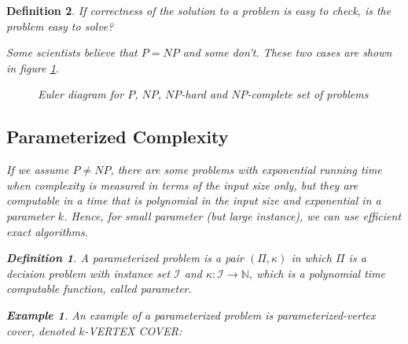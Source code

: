 \documentclass[12pt]{article}
\theoremstyle{slplain}
\newtheorem{defi}{Definition}
\newtheorem{exam}{Example}
\begin{document}
\begin{defi}
If correctness of the solution to a problem is easy to check, is the problem easy to solve? 

Some scientists believe that $P = NP$ and some don't. These two cases are shown in figure \ref{fig}.

\newcommand{\boundellipse}[3]%
{(#1) ellipse (#2 and #3)
}

\begin{figure}[!ht]
\centering


\caption{\tiny Euler diagram for $P$, $NP$, $NP$-hard and $NP$-complete set of problems}\label{fig}
\end{figure}

\newpage
\subsection{Parameterized Complexity}

If we assume $P \not = NP$, there are some problems with exponential running time when complexity is measured in terms of the input size only, but they are computable in a time that is polynomial in the input size and exponential in a parameter $k$. Hence, for small parameter (but large instance), we can use efficient exact algorithms. 

\begin{defi}
A parameterized problem is a pair $(\Pi, \kappa)$ in which $\Pi$ is a
decision problem with instance set $\mathcal{I}$ and $\kappa : \mathcal{I} \to \mathbb{N}$, which is a polynomial
time computable function, called parameter.
\end{defi}

\begin{exam}
An example of a parameterized problem is parameterized-vertex cover, denoted $k$-VERTEX COVER:


\end{exam}
\end{defi}
\end{document}
